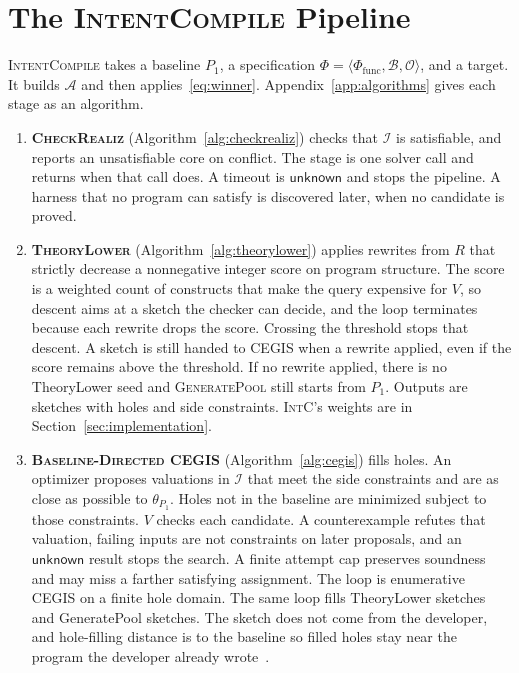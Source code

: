 \section{The \textsc{IntentCompile} Pipeline}
\label{sec:pipeline}

\textsc{IntentCompile} takes a baseline \(P_1\), a specification
\(\Phi = \langle \Phi_{\text{func}}, \mathcal{B}, \mathcal{O} \rangle\), and a target. It
builds \(\mathcal{A}\) and then applies~\eqref{eq:winner}.
Appendix~\ref{app:algorithms} gives each stage as an algorithm.

\begin{enumerate}
  \item \textbf{\textsc{CheckRealiz}} (Algorithm~\ref{alg:checkrealiz}) checks that \(\mathcal{I}\) is
  satisfiable, and reports an unsatisfiable core on conflict. The stage is
  one solver call and returns when that call does. A timeout is
  \(\mathsf{unknown}\) and stops the pipeline. A harness that no program can
  satisfy is discovered later, when no candidate is proved.

  \item \textbf{\textsc{TheoryLower}} (Algorithm~\ref{alg:theorylower})
  applies rewrites from \(R\) that strictly decrease a nonnegative integer
  score on program structure. The score is a weighted count of constructs
  that make the query expensive for \(V\), so descent aims at a sketch the
  checker can decide, and the loop terminates because each rewrite drops
the score. Crossing the threshold stops that descent. A sketch is still
handed to CEGIS when a rewrite applied, even if the score remains above
the threshold. If no rewrite applied, there is no TheoryLower seed and
\textsc{GeneratePool} still starts from \(P_1\). Outputs are sketches with holes and side
constraints. \textsc{IntC}'s weights are in
Section~\ref{sec:implementation}.

  \item \textbf{\textsc{Baseline-Directed CEGIS}} (Algorithm~\ref{alg:cegis}) fills holes. An optimizer
  proposes valuations in \(\mathcal{I}\) that meet the side constraints and
  are as close as possible to \(\theta_{P_1}\). Holes not in the baseline
  are minimized subject to those constraints. \(V\) checks each candidate.
  A counterexample refutes that valuation, failing inputs are not constraints
  on later proposals, and an \(\mathsf{unknown}\) result stops the search. A
  finite attempt cap preserves soundness and may miss a farther satisfying
  assignment. The loop is enumerative CEGIS on a finite
  hole domain. The same loop fills TheoryLower sketches and GeneratePool
sketches. The sketch does not come from the developer, and hole-filling
distance is to the baseline so filled holes stay near the program the
developer already
wrote~\cite{solarlezama2006sketch, dantoni2016qlose}.


\end{enumerate}
